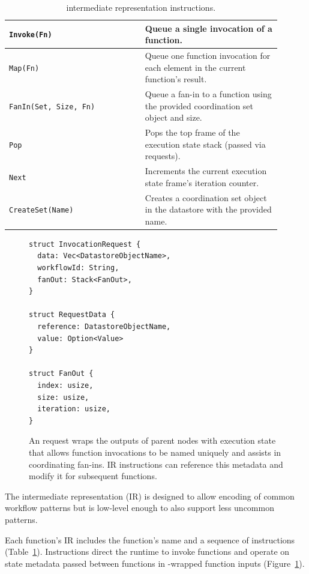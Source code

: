 \begin{table}[t]
  \centering
  \begin{tabular}{|m{0.45\linewidth}|m{0.45\linewidth}|}
    \hline
  \texttt{Invoke(Fn)} & Queue a single invocation of a function.\\
    \hline
  \texttt{Map(Fn)} & Queue one function invocation for each element in the current function's result.\\
    \hline
  \texttt{FanIn(Set, Size, Fn)} & Queue a fan-in to a function using the provided coordination set object and size.\\
    \hline
  \texttt{Pop} & Pops the top frame of the execution state stack (passed via \name{} requests). \\
    \hline
  \texttt{Next} & Increments the current execution state frame's iteration counter.\\
    \hline
  \texttt{CreateSet(Name)} & Creates a coordination set object in the datastore with the provided name.\\
    \hline
  \end{tabular}
  \caption{\name{} intermediate representation instructions.}
  \label{table:design:irschema}
\end{table}

\begin{figure}[t]
    \centering
    \begin{verbatim}
struct InvocationRequest {
  data: Vec<DatastoreObjectName>,
  workflowId: String,
  fanOut: Stack<FanOut>,
}

struct RequestData {
  reference: DatastoreObjectName,
  value: Option<Value>
}

struct FanOut {
  index: usize,
  size: usize,
  iteration: usize,
}
    \end{verbatim}
    \caption{An \name{} request wraps the outputs of parent nodes with execution
state that allows function invocations to be named uniquely and assists in
coordinating fan-ins. \name{} IR instructions can reference this metadata and
modify it for subsequent functions.}
    \label{fig:design:unum-request}
\end{figure}

The \name{} intermediate representation (IR) is designed to allow encoding of
common workflow patterns but is low-level enough to also support less uncommon
patterns.

Each function's IR includes the function's name and a sequence of instructions
(Table~\ref{table:design:irschema}). Instructions direct the runtime to invoke
functions and operate on state metadata passed between functions in
\name{}-wrapped function inputs (Figure~\ref{fig:design:unum-request}).

